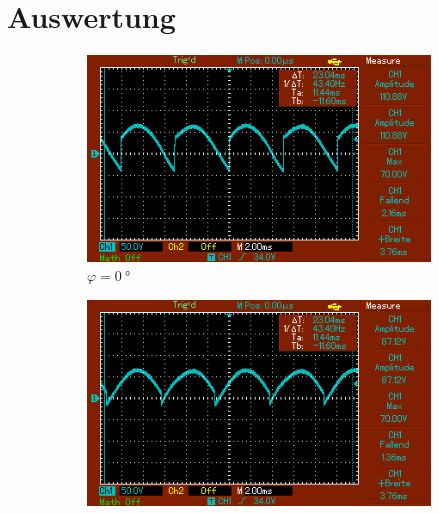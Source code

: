 \section{Auswertung}
\label{sec:Auswertung}



\begin{figure}
    \centering
    \begin{subfigure}{0.3\textwidth}
        \centering
        \includegraphics[width=\textwidth]{images/1_0.png}
        \caption{$\varphi = \SI{0}{\degree}$}
        \label{fig:1_0}
    \end{subfigure}
    \begin{subfigure}{0.3\textwidth}
        \centering
        \includegraphics[width=\textwidth]{images/1_45.png}

\end{subfigure}
\end{figure}
